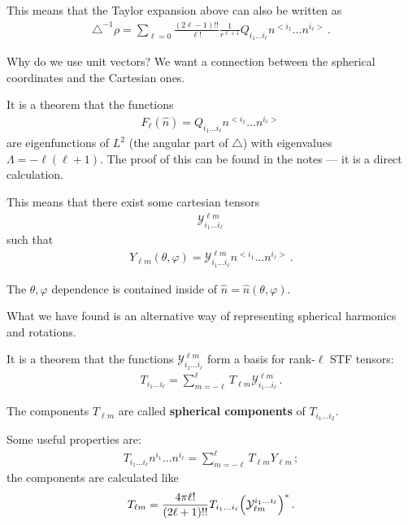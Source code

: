 \documentclass[main.tex]{subfiles}
\begin{document}
This means that the Taylor expansion above can also be written as 
%
\begin{align}
\triangle^{-1} \rho = 
\sum _{\ell=0} \frac{(2 \ell - 1)!!}{\ell!} \frac{1}{r^{\ell + 1}}
Q_{i_1 \dots i_\ell} n^{<i_1} \dots n^{i_\ell>}
\,.
\end{align}

Why do we use unit vectors?
We want a connection between the spherical coordinates and the Cartesian ones.

It is a theorem that the functions 
%
\begin{align}
F_{\ell} (\hat{n}) = Q_{i_1 \dots i_\ell} n^{<i_1} \dots n^{i_\ell>}
\,
\end{align}
%
are eigenfunctions of \(L^2\) (the angular part of \(\triangle\)) with eigenvalues \(\Lambda = - \ell (\ell + 1)\).
The proof of this can be found in the notes --- it is a direct calculation. 

This means that there exist some cartesian tensors 
%
\begin{align}
\mathcal{Y}^{\ell m}_{i_1 \dots i_\ell}
\,
\end{align}
%
such that 
%
\begin{align}
Y_{\ell m} (\theta , \varphi ) = \mathcal{Y}^{ \ell m}_{i_1 \dots i_\ell} n^{<i_1} \dots n^{i_\ell>}
\,.
\end{align}

The \(\theta , \varphi \) dependence is contained inside of \(\hat{n} = \hat{n} ( \theta , \varphi )\).

What we have found is an alternative way of representing spherical harmonics and rotations. 

It is a theorem that the functions \(\mathcal{Y}^{\ell m}_{i_1 \dots i_\ell}\) form a basis for rank-\(\ell\) STF tensors:  
%
\begin{align}
T_{i_1 \dots i_\ell} = \sum _{m= - \ell}^{\ell} T_{\ell m}
\mathcal{Y}^{\ell m}_{i_1 \dots i_\ell}
\,.
\end{align}

The components \(T_{\ell m}\) are called \textbf{spherical components} of \(T_{i_1 \dots i_2}\).

Some useful properties are: 
%
\begin{align}
T_{i_1 \dots i_\ell} n^{i_1} \dots n^{i_\ell} =
\sum _{m=-\ell}^{\ell} T_{\ell m} Y_{\ell m}
\,;
\end{align}
%
the components are calculated like 
%
\begin{align}
T_{\ell m} = \frac{4 \pi \ell!}{(2 \ell + 1)!!} T_{i_1 \dots i_\ell}
\qty(\mathcal{Y}^{i_1 \dots i_\ell}_{\ell m})^{*}
\,.
\end{align}
\end{document}
